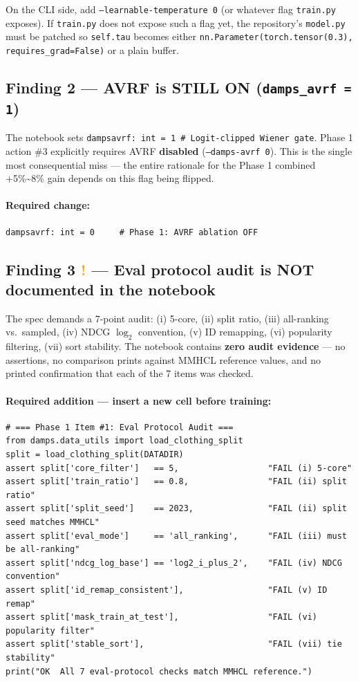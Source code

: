 \documentclass[11pt,a4paper]{article}
\newcommand{\xmark}{\ding{55}}
\begin{document}
On the CLI side, add \texttt{--learnable-temperature 0} (or whatever flag \texttt{train.py} exposes). If \texttt{train.py} does not expose such a flag yet, the repository's \texttt{model.py} must be patched so \texttt{self.tau} becomes either \texttt{nn.Parameter(torch.tensor(0.3), requires\_grad=False)} or a plain buffer.

\subsection*{Finding 2 \xmark{} --- AVRF is STILL ON (\texttt{damps\_avrf = 1})}

The notebook sets \texttt{dampsavrf: int = 1  \# Logit-clipped Wiener gate}. Phase 1 action \#3 explicitly requires AVRF \textbf{disabled} (\texttt{--damps-avrf 0}). This is the single most consequential miss --- the entire rationale for the Phase 1 combined +5\%\textasciitilde{}8\% gain depends on this flag being flipped.

\paragraph{Required change:}
\begin{lstlisting}
dampsavrf: int = 0     # Phase 1: AVRF ablation OFF
\end{lstlisting}

\subsection*{Finding 3 \textcolor{orange}{\textbf{!}} --- Eval protocol audit is NOT documented in the notebook}

The spec demands a 7-point audit: (i) 5-core, (ii) split ratio, (iii) all-ranking vs.\ sampled, (iv) NDCG $\log_2$ convention, (v) ID remapping, (vi) popularity filtering, (vii) sort stability. The notebook contains \textbf{zero audit evidence} --- no assertions, no comparison prints against MMHCL reference values, and no printed confirmation that each of the 7 items was checked.

\paragraph{Required addition --- insert a new cell before training:}
\begin{lstlisting}
# === Phase 1 Item #1: Eval Protocol Audit ===
from damps.data_utils import load_clothing_split
split = load_clothing_split(DATADIR)
assert split['core_filter']   == 5,                  "FAIL (i) 5-core"
assert split['train_ratio']   == 0.8,                "FAIL (ii) split ratio"
assert split['split_seed']    == 2023,               "FAIL (ii) split seed matches MMHCL"
assert split['eval_mode']     == 'all_ranking',      "FAIL (iii) must be all-ranking"
assert split['ndcg_log_base'] == 'log2_i_plus_2',    "FAIL (iv) NDCG convention"
assert split['id_remap_consistent'],                 "FAIL (v) ID remap"
assert split['mask_train_at_test'],                  "FAIL (vi) popularity filter"
assert split['stable_sort'],                         "FAIL (vii) tie stability"
print("OK  All 7 eval-protocol checks match MMHCL reference.")
\end{lstlisting}
\end{document}
